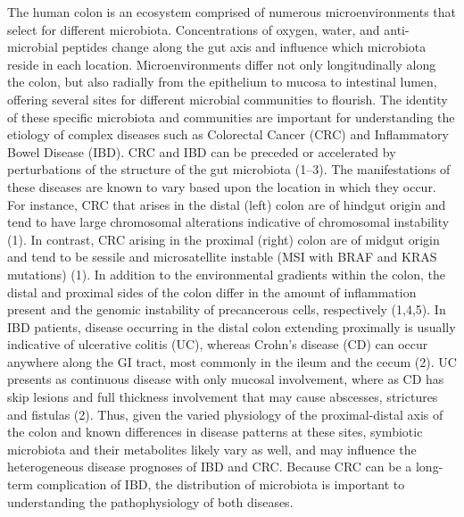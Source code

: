 \documentclass[12pt,]{article}
\begin{document}
The human colon is an ecosystem comprised of numerous microenvironments
that select for different microbiota. Concentrations of oxygen, water,
and anti-microbial peptides change along the gut axis and influence
which microbiota reside in each location. Microenvironments differ not
only longitudinally along the colon, but also radially from the
epithelium to mucosa to intestinal lumen, offering several sites for
different microbial communities to flourish. The identity of these
specific microbiota and communities are important for understanding the
etiology of complex diseases such as Colorectal Cancer (CRC) and
Inflammatory Bowel Disease (IBD). CRC and IBD can be preceded or
accelerated by perturbations of the structure of the gut microbiota
(1--3). The manifestations of these diseases are known to vary based
upon the location in which they occur. For instance, CRC that arises in
the distal (left) colon are of hindgut origin and tend to have large
chromosomal alterations indicative of chromosomal instability (1). In
contrast, CRC arising in the proximal (right) colon are of midgut origin
and tend to be sessile and microsatellite instable (MSI with BRAF and
KRAS mutations) (1). In addition to the environmental gradients within
the colon, the distal and proximal sides of the colon differ in the
amount of inflammation present and the genomic instability of
precancerous cells, respectively (1,4,5). In IBD patients, disease
occurring in the distal colon extending proximally is usually indicative
of ulcerative colitis (UC), whereas Crohn's disease (CD) can occur
anywhere along the GI tract, most commonly in the ileum and the cecum
(2). UC presents as continuous disease with only mucosal involvement,
where as CD has skip lesions and full thickness involvement that may
cause abscesses, strictures and fistulas (2). Thus, given the varied
physiology of the proximal-distal axis of the colon and known
differences in disease patterns at these sites, symbiotic microbiota and
their metabolites likely vary as well, and may influence the
heterogeneous disease prognoses of IBD and CRC. Because CRC can be a
long-term complication of IBD, the distribution of microbiota is
important to understanding the pathophysiology of both diseases.
\end{document}
